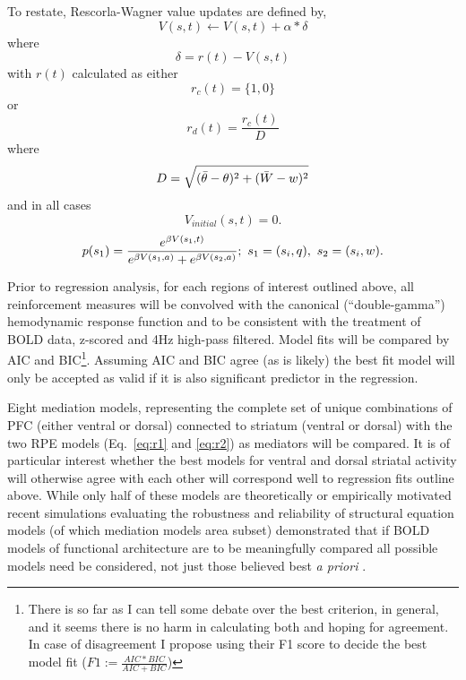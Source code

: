 \documentclass[doc,12pt]{apa}        %
\begin{document}
To restate, Rescorla-Wagner value updates are defined by,
\begin{equation} \label{eq:V} V(s,t) \leftarrow V(s,t) + \alpha*\delta \end{equation} where 
\begin{equation} \label{eq:rpe} \delta = r(t) - V(s,t) \end{equation}
with $r(t)$ calculated as either
\begin{equation}
	\label{eq:r1}
	r_{c}(t) = \{1,0\}
\end{equation}
or
\begin{equation}
	\label{eq:r2}
    r_{d}(t) = \frac{r_{c}(t)}{D}
\end{equation}
where
\begin{equation}
	\label{eq:D}\\
	D = \sqrt{(\bar{\theta} - \theta)^2 + (\bar{W}-w)^2}
\end{equation}
and in all cases
\begin{equation} \label{eq:V0} V_{initial}(s,t) = 0. \end{equation}
\begin{equation}
	\label{eq:softmax}
	p(s_1) = {e^{\beta V(s_1,t)}\over{e^{\beta V(s_1,a)} + e^{\beta V(s_2,a)}}};\ s_1 = (s_{i},q), \ s_2 = (s_{i}, w).
\end{equation}

Prior to regression analysis, for each regions of interest outlined above, all reinforcement measures will be convolved with the canonical (``double-gamma'') hemodynamic response function and to be consistent with the treatment of BOLD data, z-scored and 4Hz high-pass filtered.  Model fits will be compared by AIC and BIC\footnote{There is so far as I can tell some debate over the best criterion, in general, and it seems there is no harm in calculating both and hoping for agreement.  In case of disagreement I propose using their F1 score to decide the best model fit ($F1 := \frac{AIC*BIC}{AIC+BIC}$) }. Assuming AIC and BIC agree (as is likely) the best fit model will only be accepted as valid if it is also significant predictor in the regression.

Eight mediation models, representing the complete set of unique combinations of PFC (either ventral or dorsal) connected to striatum (ventral or dorsal) with the two RPE models (Eq.~\ref{eq:r1} and \ref{eq:r2}) as mediators will be compared.   It is of particular interest whether the best models for ventral and dorsal striatal activity will otherwise agree with each other will correspond well to regression fits outline above. While only half of these models are theoretically or empirically motivated recent simulations evaluating the robustness and reliability of structural equation models (of which mediation models area subset) demonstrated that if BOLD models of functional architecture are to be meaningfully compared all possible models need be considered, not just those believed best \emph{a priori} \cite{Lohmann:2011p8418}.
\end{document}
